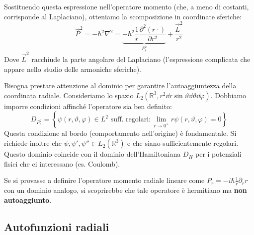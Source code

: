 Sostituendo questa espressione nell'operatore momento (che, a meno di costanti, corrisponde al Laplaciano), otteniamo la scomposizione in coordinate sferiche:
\begin{equation}
    \vec{P}^2 = -\hbar^2 \nabla^2 = \underbrace{-\hbar^2 \frac{1}{r} \frac{\partial^2 (r \cdot)}{\partial r^2}}_{P_r^2} + \frac{\vec{L}^2}{r^2}
\end{equation}
Dove \( \vec{L}^2 \) racchiude la parte angolare del Laplaciano (l'espressione complicata che appare nello studio delle armoniche sferiche).

Bisogna prestare attenzione al dominio per garantire l'autoaggiuntezza della coordinata radiale.
Consideriamo lo spazio \( L_2(\mathbb{R}^3, r^2 \dd{r} \sin\vartheta \dd{\vartheta} \dd{\varphi}) \). Dobbiamo imporre condizioni affinché l'operatore sia ben definito:
\begin{equation}
    D_{P_r^2} = \left\{ \psi(r, \vartheta, \varphi) \in L^2 \text{ suff. regolari} : \lim_{r \to 0^+} r\psi(r, \vartheta, \varphi) = 0 \right\}
\end{equation}
Questa condizione al bordo (comportamento nell'origine) è fondamentale.
Si richiede inoltre che \( \psi, \psi', \psi'' \in L_2(\mathbb{R}^3) \) e che siano sufficientemente regolari.
Questo dominio coincide con il dominio dell'Hamiltoniana \( D_H \) per i potenziali fisici che ci interessano (es. Coulomb).

\begin{remark}
    Se si provasse a definire l'operatore momento radiale lineare come \( P_r = -i\hbar \frac{1}{r} \partial_r r \) con un dominio analogo, si scoprirebbe che tale operatore è hermitiano ma \textbf{non autoaggiunto}.
\end{remark}


\subsection{Autofunzioni radiali}

